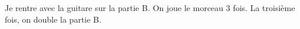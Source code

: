 \tune

Je rentre avec la guitare sur la partie B. On joue le morceau 3 fois. La
troisième fois, on double la partie B.
